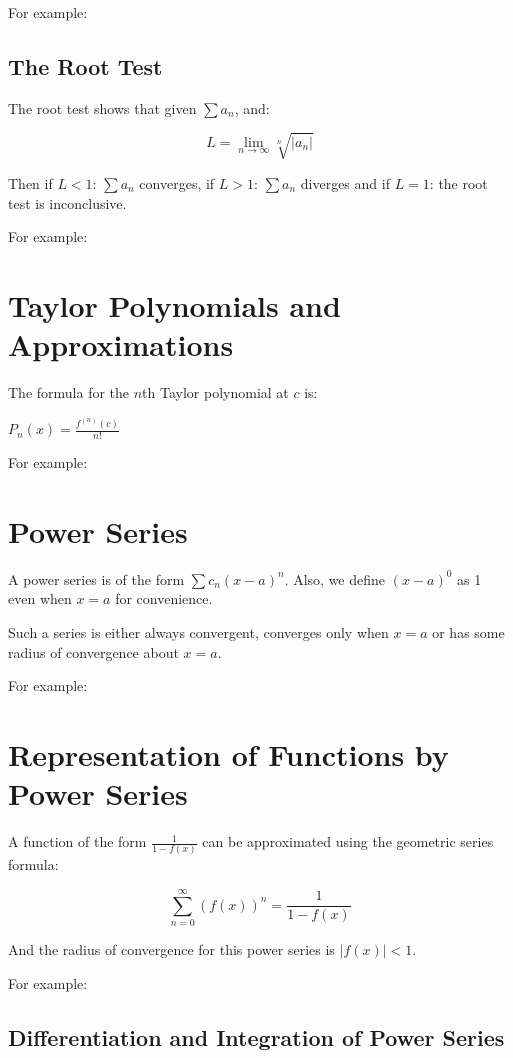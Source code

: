 \documentclass{article}
\let\oldsqrt\sqrt
\def\sqrt{\mathpalette\DHLhksqrt}
\def\DHLhksqrt#1#2{%
\setbox0=\hbox{$#1\oldsqrt{#2\,}$}\dimen0=\ht0
\advance\dimen0-0.2\ht0
\setbox2=\hbox{\vrule height\ht0 depth -\dimen0}%
{\box0\lower0.4pt\box2}}
\begin{document}
For example:

\subsection{The Root Test}

The root test shows that given $\sum a_n$, and:

\[
L = \lim_{n \to \infty} \oldsqrt[n]{\left| a_n \right|}
\]

Then if $L < 1$: $\sum a_n$ converges, if $L > 1$: $\sum a_n$
diverges and if $L = 1$: the root test is inconclusive.

For example:

\section{Taylor Polynomials and Approximations}

The formula for the $n$th Taylor polynomial at $c$ is:

$P_n(x) = \frac{f^{(n)}(c)}{n!}$

For example:

\section{Power Series}

A power series is of the form $\sum c_n(x-a)^n$.  Also, we define
$(x-a)^0$ as 1 even when $x=a$ for convenience.

Such a series is either always convergent, converges only when $x=a$
or has some radius of convergence about $x=a$.

For example:

\section{Representation of Functions by Power Series}

A function of the form $\frac{1}{1-f(x)}$ can be approximated using
the geometric series formula:

\[
\sum_{n=0}^\infty (f(x))^n = \frac{1}{1-f(x)}
\]

And the radius of convergence for this power series is $\left| f(x) \right| < 1$.

For example:

\subsection{Differentiation and Integration of Power Series}
\end{document}
